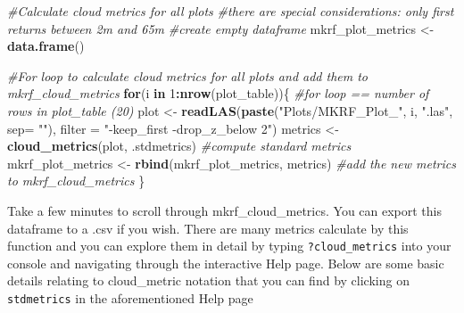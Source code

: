 \documentclass[
]{book}
\newenvironment{Shaded}{\begin{snugshade}}{\end{snugshade}}
\newcommand{\AttributeTok}[1]{\textcolor[rgb]{0.13,0.29,0.53}{#1}}
\newcommand{\CommentTok}[1]{\textcolor[rgb]{0.56,0.35,0.01}{\textit{#1}}}
\newcommand{\ControlFlowTok}[1]{\textcolor[rgb]{0.13,0.29,0.53}{\textbf{#1}}}
\newcommand{\DecValTok}[1]{\textcolor[rgb]{0.00,0.00,0.81}{#1}}
\newcommand{\FunctionTok}[1]{\textcolor[rgb]{0.13,0.29,0.53}{\textbf{#1}}}
\newcommand{\NormalTok}[1]{#1}
\newcommand{\OtherTok}[1]{\textcolor[rgb]{0.56,0.35,0.01}{#1}}
\newcommand{\SpecialCharTok}[1]{\textcolor[rgb]{0.81,0.36,0.00}{\textbf{#1}}}
\newcommand{\StringTok}[1]{\textcolor[rgb]{0.31,0.60,0.02}{#1}}
\begin{document}
\begin{Shaded}
\begin{Highlighting}[]
\CommentTok{\#Calculate cloud metrics for all plots}
\CommentTok{\#there are special considerations: only first returns between 2m and 65m}
\CommentTok{\#create empty dataframe}
\NormalTok{mkrf\_plot\_metrics }\OtherTok{\textless{}{-}} \FunctionTok{data.frame}\NormalTok{() }

\CommentTok{\#For loop to calculate cloud metrics for all plots and add them to \textquotesingle{}mkrf\_cloud\_metrics\textquotesingle{}}
\ControlFlowTok{for}\NormalTok{(i }\ControlFlowTok{in} \DecValTok{1}\SpecialCharTok{:}\FunctionTok{nrow}\NormalTok{(plot\_table))\{ }\CommentTok{\#for loop == number of rows in plot\_table (20)}
\NormalTok{  plot }\OtherTok{\textless{}{-}} \FunctionTok{readLAS}\NormalTok{(}\FunctionTok{paste}\NormalTok{(}\StringTok{"Plots/MKRF\_Plot\_"}\NormalTok{, i, }\StringTok{".las"}\NormalTok{, }\AttributeTok{sep=} \StringTok{""}\NormalTok{), }\AttributeTok{filter =} \StringTok{"{-}keep\_first {-}drop\_z\_below 2"}\NormalTok{)}
\NormalTok{  metrics }\OtherTok{\textless{}{-}} \FunctionTok{cloud\_metrics}\NormalTok{(plot, .stdmetrics) }\CommentTok{\#compute standard metrics}
\NormalTok{  mkrf\_plot\_metrics }\OtherTok{\textless{}{-}} \FunctionTok{rbind}\NormalTok{(mkrf\_plot\_metrics, metrics) }\CommentTok{\#add the new \textquotesingle{}metrics\textquotesingle{} to \textquotesingle{}mkrf\_cloud\_metrics\textquotesingle{}}
\NormalTok{\}}
\end{Highlighting}
\end{Shaded}

Take a few minutes to scroll through mkrf\_cloud\_metrics. You can export this dataframe to a .csv if you wish. There are many metrics calculate by this function and you can explore them in detail by typing \texttt{?cloud\_metrics} into your console and navigating through the interactive Help page. Below are some basic details relating to cloud\_metric notation that you can find by clicking on \texttt{stdmetrics} in the aforementioned Help page
\end{document}
